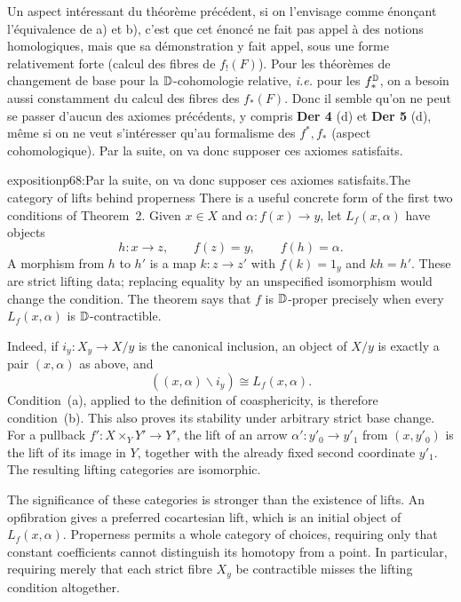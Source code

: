 Un aspect intéressant du théorème précédent, si on l'envisage comme énonçant l'équivalence de a) et b), c'est que cet énoncé ne fait pas appel à des notions homologiques, mais que sa démonstration y fait appel, sous une forme relativement forte (calcul des fibres de $f_!(F)$). Pour les théorèmes de changement de base pour la $\mathbb{D}$-cohomologie relative, \textit{i.e.} pour les $f_*^{\mathbb{D}}$, on a besoin aussi constamment du calcul des fibres des $f_*(F)$. Donc il semble qu'on ne peut se passer d'aucun des axiomes précédents, y compris \textbf{Der 4} (d) et \textbf{Der 5} (d), même si on ne veut s'intéresser qu'au formalisme des $f^*, f_*$ (aspect cohomologique). Par la suite, on va donc supposer ces axiomes satisfaits.

\begin{dcomment}{exposition}{p68:Par la suite, on va donc supposer ces axiomes satisfaits.}{The category of lifts behind properness}
There is a useful concrete form of the first two conditions of Theorem~2. Given $x\in X$ and $\alpha:f(x)\to y$, let $L_f(x,\alpha)$ have objects
\[
 h:x\longrightarrow z,\qquad f(z)=y,\qquad f(h)=\alpha.
\]
A morphism from $h$ to $h'$ is a map $k:z\to z'$ with $f(k)=1_y$ and $kh=h'$. These are strict lifting data; replacing equality by an unspecified isomorphism would change the condition. The theorem says that $f$ is $\mathbb{D}$-proper precisely when every $L_f(x,\alpha)$ is $\mathbb{D}$-contractible.

Indeed, if $i_y:X_y\to X/y$ is the canonical inclusion, an object of $X/y$ is exactly a pair $(x,\alpha)$ as above, and
\[
 ((x,\alpha)\backslash i_y)\cong L_f(x,\alpha).
\]
Condition~(a), applied to the definition of coasphericity, is therefore condition~(b). This also proves its stability under arbitrary strict base change. For a pullback $f':X\times_Y Y'\to Y'$, the lift of an arrow $\alpha':y'_0\to y'_1$ from $(x,y'_0)$ is the lift of its image in $Y$, together with the already fixed second coordinate $y'_1$. The resulting lifting categories are isomorphic.

The significance of these categories is stronger than the existence of lifts. An opfibration gives a preferred cocartesian lift, which is an initial object of $L_f(x,\alpha)$. Properness permits a whole category of choices, requiring only that constant coefficients cannot distinguish its homotopy from a point. In particular, requiring merely that each strict fibre $X_y$ be contractible misses the lifting condition altogether.


\end{dcomment}
